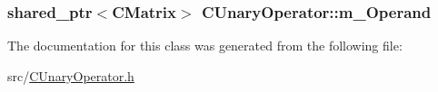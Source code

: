 \subsubsection[{\texorpdfstring{m\+\_\+\+Operand}{m_Operand}}]{\setlength{\rightskip}{0pt plus 5cm}shared\+\_\+ptr$<${\bf C\+Matrix}$>$ C\+Unary\+Operator\+::m\+\_\+\+Operand\hspace{0.3cm}{\ttfamily [protected]}}\hypertarget{classCUnaryOperator_a36090d3cf3f21ebf4b9dca948aa5dcfc}{}\label{classCUnaryOperator_a36090d3cf3f21ebf4b9dca948aa5dcfc}


The documentation for this class was generated from the following file\+:\begin{DoxyCompactItemize}
\item 
src/\hyperlink{CUnaryOperator_8h}{C\+Unary\+Operator.\+h}\end{DoxyCompactItemize}
